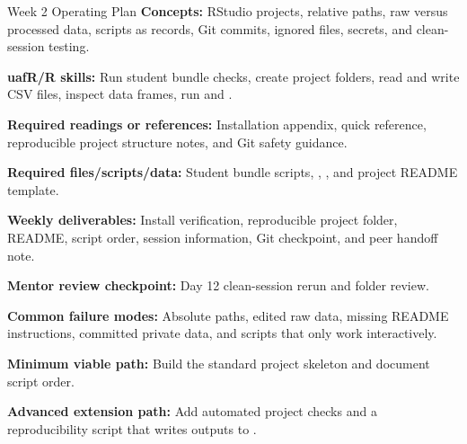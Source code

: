 \begin{checklistbox}{Week 2 Operating Plan}
\textbf{Concepts:} RStudio projects, relative paths, raw versus processed data, scripts as records, Git commits, ignored files, secrets, and clean-session testing.

\textbf{uafR/R skills:} Run student bundle checks, create project folders, read and write CSV files, inspect data frames, run  and .

\textbf{Required readings or references:} Installation appendix, quick reference, reproducible project structure notes, and Git safety guidance.

\textbf{Required files/scripts/data:} Student bundle scripts, , , and project README template.

\textbf{Weekly deliverables:} Install verification, reproducible project folder, README, script order, session information, Git checkpoint, and peer handoff note.

\textbf{Mentor review checkpoint:} Day 12 clean-session rerun and folder review.

\textbf{Common failure modes:} Absolute paths, edited raw data, missing README instructions, committed private data, and scripts that only work interactively.

\textbf{Minimum viable path:} Build the standard project skeleton and document script order.

\textbf{Advanced extension path:} Add automated project checks and a reproducibility script that writes outputs to .
\end{checklistbox}

